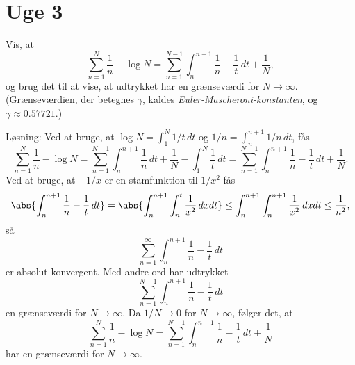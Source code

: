 	\section{Uge 3}
	\begin{opg}
		Vis, at 
		$$
		\sum_{n = 1}^{N} \frac{1}{n} - \log N = \sum_{n = 1}^{N - 1} \int_{n}^{n+1} \frac{1}{n} - \frac{1}{t}\,dt + \frac{1}{N},
		$$
		og brug det til at vise, at udtrykket har en grænseværdi for $N \to \infty$. (Grænseværdien, der betegnes $\gamma$, kaldes \emph{Euler-Mascheroni-konstanten}, og $\gamma \approx 0.57721$.)
	\end{opg}
	Løsning: Ved at bruge, at $\log N = \int_{1}^{N} 1/t\,dt$ og $1/n = \int_{n}^{n + 1} 1/n\,dt$, fås
	$$
	\sum_{n = 1}^{N} \frac{1}{n} - \log N = \sum_{n = 1}^{N-1}\int_{n}^{n + 1} \frac{1}{n}\,dt + \frac{1}{N} - \int_1^N \frac{1}{t}\,dt = \sum_{n = 1}^{N-1}\int_{n}^{n + 1} \frac{1}{n} - \frac{1}{t}\,dt + \frac{1}{N}.
	$$
	Ved at bruge, at $-1/x$ er en stamfunktion til $1/x^2$ fås
	$$
	\abs{\int_{n}^{n + 1} \frac{1}{n} - \frac{1}{t}\,dt} = \abs{\int_{n}^{n + 1}\int_{n}^{t}\frac{1}{x^2}\,dxdt} \leq \int_{n}^{n+1}\int_{n}^{n+1} \frac{1}{x^2} \,dxdt \leq \frac{1}{n^2},
	$$
	så
	$$
	\sum_{n = 1}^{\infty} \int_{n}^{n+1} \frac{1}{n} - \frac{1}{t}\,dt
	$$
	er absolut konvergent. Med andre ord har udtrykket
	$$
	\sum_{n = 1}^{N - 1} \int_{n}^{n+1} \frac{1}{n} - \frac{1}{t}\,dt
	$$
	en grænseværdi for $N \to \infty$. Da $1/N \to 0$ for $N \to \infty$, følger det, at
	$$
	\sum_{n = 1}^{N} \frac{1}{n} - \log N = \sum_{n = 1}^{N - 1} \int_{n}^{n+1} \frac{1}{n} - \frac{1}{t}\,dt + \frac{1}{N}
	$$
	har en grænseværdi for $N \to \infty$.